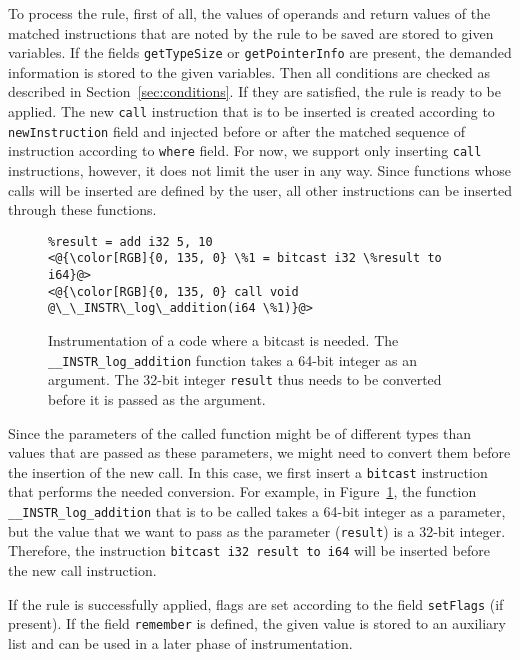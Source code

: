 To process the rule, first of all, the values of operands and return values of
the matched instructions that are noted by the rule to be saved are stored to
given variables. If the fields \texttt{getTypeSize} or \texttt{getPointerInfo}
are present, the demanded information is stored to the given variables. Then
all conditions are checked as described in Section~\ref{sec:conditions}. If
they are satisfied, the rule is ready to be applied. The new \texttt{call}
instruction that is to be inserted is created according to
\texttt{newInstruction} field and injected before or after the matched sequence
of instruction according to \texttt{where} field. For now, we support only
inserting \texttt{call} instructions, however, it does not limit the user in
any way. Since functions whose calls will be inserted are defined by the user,
all other instructions can be inserted through these functions.

\begin{figure}[h]
\begin{lstlisting}
%result = add i32 5, 10
<@{\color[RGB]{0, 135, 0} \%1 = bitcast i32 \%result to i64}@>
<@{\color[RGB]{0, 135, 0} call void @\_\_INSTR\_log\_addition(i64 \%1)}@>
\end{lstlisting}
\caption{Instrumentation of a code where a bitcast is needed. The
\texttt{\_\_INSTR\_log\_addition} function takes a 64-bit integer as an
argument. The 32-bit integer \texttt{result} thus needs to be converted before
it is passed as the argument.}
\label{fig:bitcast_example}
\end{figure}
Since the parameters of the called function might be of different types than
values that are passed as these parameters, we might need to convert them
before the insertion of the new call. In this case, we first insert a
\texttt{bitcast} instruction that performs the needed conversion. For example,
in Figure~\ref{fig:bitcast_example}, the function
\texttt{\_\_INSTR\_log\_addition} that is to be called takes a 64-bit integer
as a parameter, but the value that we want to pass as the parameter
(\texttt{result}) is a 32-bit integer. Therefore, the instruction \texttt{bitcast
i32 result to i64} will be inserted before the new call instruction.

If the rule is successfully applied, flags are set according to the field
\texttt{setFlags} (if present). If the field \texttt{remember} is defined, the
given value is stored to an auxiliary list and can be used in a later phase of
instrumentation.

